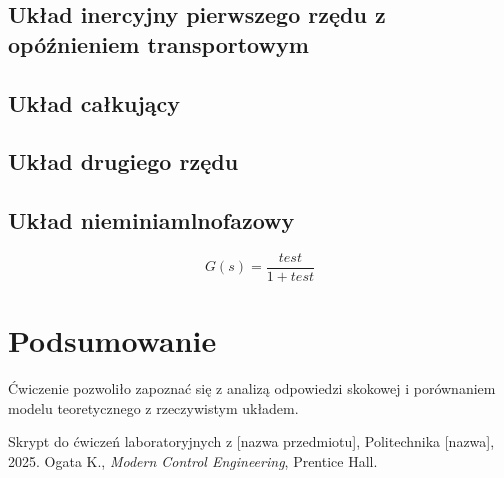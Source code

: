 \documentclass[12pt,a4paper]{article}
\begin{document}
	\subsection{Układ inercyjny pierwszego rzędu z opóźnieniem transportowym}	
	
	\subsection{Układ całkujący}
	
	\subsection{Układ drugiego rzędu}
	
	\subsection{Układ nieminiamlnofazowy}
	
	\begin{equation}
		G(s) = \frac{test}{1 + test}
	\end{equation}
	
	\section{Podsumowanie}
	Ćwiczenie pozwoliło zapoznać się z analizą odpowiedzi skokowej i porównaniem modelu teoretycznego z rzeczywistym układem.
	
	\begin{thebibliography}{9}
		 Skrypt do ćwiczeń laboratoryjnych z [nazwa przedmiotu], Politechnika [nazwa], 2025.
		 Ogata K., \textit{Modern Control Engineering}, Prentice Hall.
	\end{thebibliography}
	
\end{document}
